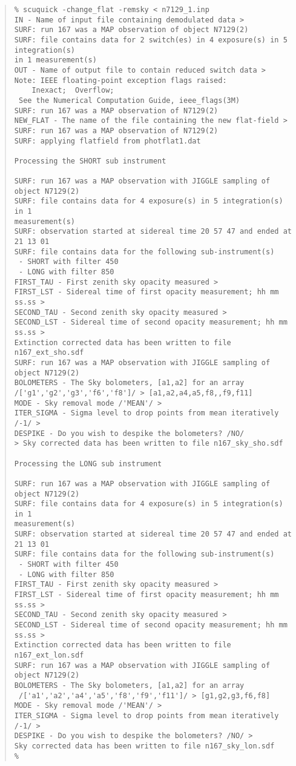 \documentclass[twoside,11pt]{article}
\newenvironment{myquote}{\begin{quote}\begin{small}}{\end{small}\end{quote}}
\begin{document}
\begin{myquote} \begin{verbatim}
% scuquick -change_flat -remsky < n7129_1.inp
IN - Name of input file containing demodulated data > 
SURF: run 167 was a MAP observation of object N7129(2)
SURF: file contains data for 2 switch(es) in 4 exposure(s) in 5 integration(s)
in 1 measurement(s)
OUT - Name of output file to contain reduced switch data >  
Note: IEEE floating-point exception flags raised: 
    Inexact;  Overflow; 
 See the Numerical Computation Guide, ieee_flags(3M) 
SURF: run 167 was a MAP observation of N7129(2)
NEW_FLAT - The name of the file containing the new flat-field > 
SURF: run 167 was a MAP observation of N7129(2)
SURF: applying flatfield from photflat1.dat
 
Processing the SHORT sub instrument
 
SURF: run 167 was a MAP observation with JIGGLE sampling of object N7129(2)
SURF: file contains data for 4 exposure(s) in 5 integration(s) in 1
measurement(s)
SURF: observation started at sidereal time 20 57 47 and ended at 21 13 01
SURF: file contains data for the following sub-instrument(s)
 - SHORT with filter 450
 - LONG with filter 850
FIRST_TAU - First zenith sky opacity measured > 
FIRST_LST - Sidereal time of first opacity measurement; hh mm ss.ss > 
SECOND_TAU - Second zenith sky opacity measured > 
SECOND_LST - Sidereal time of second opacity measurement; hh mm ss.ss >
Extinction corrected data has been written to file n167_ext_sho.sdf
SURF: run 167 was a MAP observation with JIGGLE sampling of object N7129(2)
BOLOMETERS - The Sky bolometers, [a1,a2] for an array
/['g1','g2','g3','f6','f8']/ > [a1,a2,a4,a5,f8,,f9,f11]
MODE - Sky removal mode /'MEAN'/ > 
ITER_SIGMA - Sigma level to drop points from mean iteratively /-1/ > 
DESPIKE - Do you wish to despike the bolometers? /NO/ 
> Sky corrected data has been written to file n167_sky_sho.sdf
 
Processing the LONG sub instrument
 
SURF: run 167 was a MAP observation with JIGGLE sampling of object N7129(2)
SURF: file contains data for 4 exposure(s) in 5 integration(s) in 1
measurement(s)
SURF: observation started at sidereal time 20 57 47 and ended at 21 13 01
SURF: file contains data for the following sub-instrument(s)
 - SHORT with filter 450
 - LONG with filter 850
FIRST_TAU - First zenith sky opacity measured > 
FIRST_LST - Sidereal time of first opacity measurement; hh mm ss.ss > 
SECOND_TAU - Second zenith sky opacity measured > 
SECOND_LST - Sidereal time of second opacity measurement; hh mm ss.ss > 
Extinction corrected data has been written to file n167_ext_lon.sdf
SURF: run 167 was a MAP observation with JIGGLE sampling of object N7129(2)
BOLOMETERS - The Sky bolometers, [a1,a2] for an array
 /['a1','a2','a4','a5','f8','f9','f11']/ > [g1,g2,g3,f6,f8]
MODE - Sky removal mode /'MEAN'/ > 
ITER_SIGMA - Sigma level to drop points from mean iteratively /-1/ > 
DESPIKE - Do you wish to despike the bolometers? /NO/ > 
Sky corrected data has been written to file n167_sky_lon.sdf
% 
\end{verbatim} \end{myquote}
\end{document}
